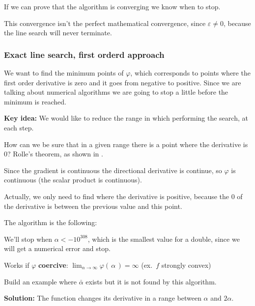 \documentclass[computational_mathematics.tex]{subfiles}
\begin{document}
If we can prove that the algorithm is converging we know when to stop.

This convergence isn't the perfect mathematical convergence, since $\varepsilon \ne 0$, because the line search will never terminate.


\subsubsection{Exact line search, first orderd approach}
We want to find the minimum points of $\varphi$, which corresponds to points where the first order derivative is zero and it goes from negative to positive. Since we are talking about numerical algorithms we are going to stop a little before the minimum is reached.

\textbf{Key idea:} We would like to reduce the range in which performing the search, at each step.

How can we be sure that in a given range there is a point where the derivative is $0$? Rolle's theorem, as shown in .


Since the gradient is continuous the directional derivative is continue, so $\varphi$ is continuous (the scalar product is continuous).

Actually, we only need to find where the derivative is positive, because the $0$ of the derivative is between the previous value and this point.

The algorithm is the following:


We'll stop when $\alpha < -{10}^{308}$, which is the smallest value for a double, since we will get a numerical error and stop.

Works if $\varphi$ \textbf{coercive}:
       $\lim_{\alpha \to \infty} \varphi( \, \alpha \, ) = \infty$
       (ex.~$f$ strongly convex)

\begin{exe}
Build an example where $\bar{\alpha}$ exists but it is not found by this algorithm.
\end{exe}
\textbf{Solution:} The function changes its derivative in a range between $\alpha$ and $2 \alpha$.
\end{document}

